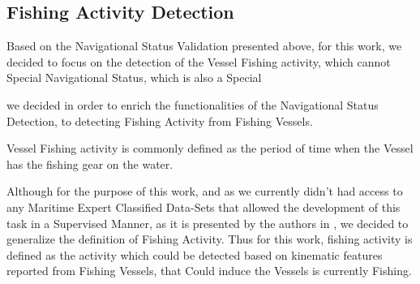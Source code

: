 \subsection{Fishing Activity Detection}
\label{subsection: Fishing Activity Detection}

Based on the Navigational Status Validation presented above, for this work, we decided to focus on the detection of the Vessel Fishing activity, which cannot Special Navigational Status, which is also a Special 

we decided in order to enrich the functionalities of the Navigational Status Detection, to detecting Fishing Activity from Fishing Vessels. 

Vessel Fishing activity is commonly defined as the period of time when the Vessel has the fishing gear on the water. 

Although for the purpose of this work, and as we currently didn't had access to any Maritime Expert Classified Data-Sets that allowed the development of this task in a Supervised Manner, as it is presented by the authors in \cite{DeSouza2016ImprovingLearning}, we decided to generalize the definition of Fishing Activity.
Thus for this work, fishing activity is defined as the activity which could be detected based on kinematic features reported from Fishing Vessels, that Could induce the Vessels is currently Fishing. 

